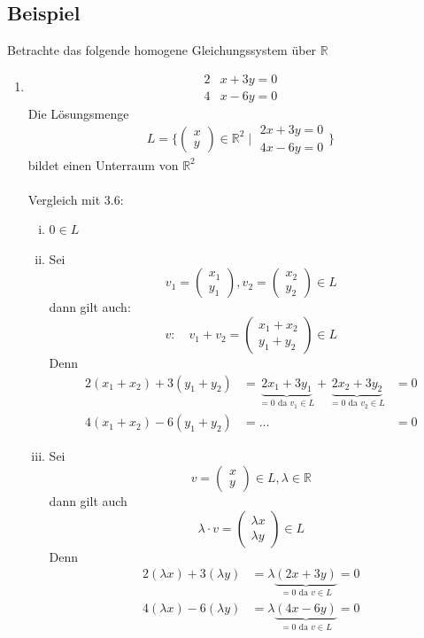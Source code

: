 \subsection{Beispiel}
Betrachte das folgende homogene Gleichungssystem über $\mathds{R}$
\begin{enumerate}[(1)]
\item
\begin{align*}
2 &x + 3 y = 0 \\
4 &x - 6 y = 0
\end{align*}
Die Lösungsmenge 
\[
L=
\Bigg\{ 
\begin{pmatrix} x \\ y \end{pmatrix} 
\in \mathds{R}^2 \mid
\begin{matrix} 2x +3y = 0 \\ 4x -6y =0 \end{matrix} 
\Bigg\}
\]
bildet einen Unterraum von $\mathds{R}^2$ \\
\vspace{\baselineskip} \\
Vergleich mit 3.6:
\begin{enumerate}[i)]
\item $0 \in L$
\item Sei 
\[
v_1= \begin{pmatrix} x_1 \\ y_1 \end{pmatrix} , 
v_2= \begin{pmatrix} x_2 \\ y_2 \end{pmatrix} \in L
\]
dann gilt auch:
\[
v: \quad v_1 + v_2 = \begin{pmatrix} x_1 +x_2 \\ y_1 + y_2 \end{pmatrix} \in L
\]
Denn 
\begin{align*}
2(x_1 + x_2) + 3 (y_1 + y_2) &= 
\underbrace {2x_1 + 3y_1}_{=0 \text{ da } v_1 \in L} + \underbrace{2x_2 +3y_2}_{=0 \text{ da } v_2 \in L} &= 0 \\
4(x_1 + x_2) - 6 (y_1 + y_2) &= \ldots &= 0
\end{align*}

\item Sei 
\[
v= \begin{pmatrix} x \\ y \end{pmatrix} \in L , \lambda \in \mathds{R}
\]
dann gilt auch 
\[
\lambda \cdot v = \begin{pmatrix} \lambda x \\ \lambda y \end{pmatrix} \in L
\]
Denn
\begin{align*}
2( \lambda x ) + 3 ( \lambda y) &= \lambda \underbrace{(2x+3y)}_{=0 \text{ da } v \in L} = 0 \\
4( \lambda x ) -  6 ( \lambda y) &= \lambda \underbrace{(4x-6y)}_{=0 \text{ da } v \in L} = 0
\end{align*}


\end{enumerate}
\end{enumerate}
